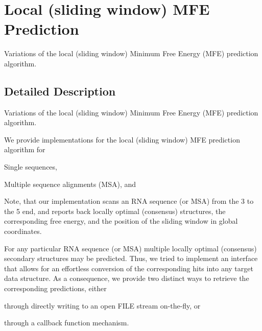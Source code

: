 \hypertarget{group__mfe__window}{}\section{Local (sliding window) M\+FE Prediction}
\label{group__mfe__window}


Variations of the local (sliding window) Minimum Free Energy (M\+FE) prediction algorithm.  




\subsection{Detailed Description}
Variations of the local (sliding window) Minimum Free Energy (M\+FE) prediction algorithm. 

We provide implementations for the local (sliding window) M\+FE prediction algorithm for
\begin{DoxyItemize}
\item Single sequences,
\item Multiple sequence alignments (M\+SA), and
\end{DoxyItemize}

Note, that our implementation scans an R\+NA sequence (or M\+SA) from the 3\textquotesingle{} to the 5\textquotesingle{} end, and reports back locally optimal (consensus) structures, the corresponding free energy, and the position of the sliding window in global coordinates.

For any particular R\+NA sequence (or M\+SA) multiple locally optimal (consensus) secondary structures may be predicted. Thus, we tried to implement an interface that allows for an effortless conversion of the corresponding hits into any target data structure. As a consequence, we provide two distinct ways to retrieve the corresponding predictions, either
\begin{DoxyItemize}
\item through directly writing to an open {\ttfamily F\+I\+LE} stream on-\/the-\/fly, or
\item through a callback function mechanism.
\end{DoxyItemize}

